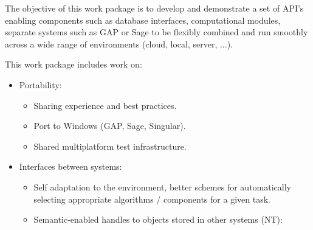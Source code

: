 \addtocounter{wpno}{1}
\begin{Workpackage}{\thewpno}
\WPTitle{\wpname{\thewpno}}

\begin{WPObjectives}
  The objective of this work package is to develop and demonstrate a
  set of API's enabling components such as database interfaces,
  computational modules, separate systems such as GAP or Sage to be
  flexibly combined and run smoothly across a wide range of
  environments (cloud, local, server, ...).
\end{WPObjectives}

\begin{WPDescription}
  This work package includes work on:
  \begin{itemize}
  \item Portability:
    \begin{itemize}
    \item Sharing experience and best practices.
    \item Port to Windows (GAP, Sage, Singular).
    \item Shared multiplatform test infrastructure.
    \end{itemize}

  \item Interfaces between systems:
    \begin{itemize}
    \item Self adaptation to the environment, better schemes for
      automatically selecting appropriate algorithms / components for
      a given task.
    \item Semantic-enabled handles to objects stored in other systems (NT):\\


\end{itemize}
\end{itemize}
\end{WPDescription}
\end{Workpackage}

